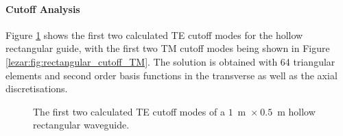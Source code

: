 \paragraph{Cutoff Analysis}

Figure \ref{lezar:fig:rectangular_cutoff_TE} shows the first two calculated
TE cutoff modes for the hollow rectangular guide, with the first two
TM cutoff modes being shown in Figure
\ref{lezar:fig:rectangular_cutoff_TM}. The solution is obtained with 64
triangular elements and second order basis functions in the transverse
as well as the axial discretisations.
\begin{figure}[ht]
\centering
\caption{The first two calculated TE cutoff modes of a $1$~m~$\times~0.5$~m hollow rectangular waveguide.}
\label{lezar:fig:rectangular_cutoff_TE}
\end{figure}

